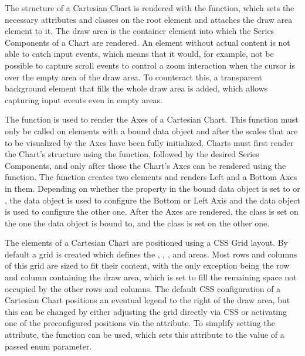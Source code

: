 The structure of a Cartesian Chart is rendered with the  function, which sets the necessary attributes and classes on the root element and attaches the draw area  element to it.
The draw area is the container element into which the Series Components of a Chart are rendered.
An  element without actual content is not able to catch input events, which means that it would, for example, not be possible to capture scroll events to control a zoom interaction when the cursor is over the empty area of the draw area.
To counteract this, a transparent  background element that fills the whole draw area is added, which allows capturing input events even in empty areas.

The  function is used to render the Axes of a Cartesian Chart.
This function must only be called on elements with a bound  data object and after the scales that are to be visualized by the Axes have been fully initialized.
Charts must first render the Chart's structure using the  function, followed by the desired Series Components, and only after those the Chart's Axes can be rendered using the  function.
The  function creates two  elements and renders Left and a Bottom Axes in them.
Depending on whether the  property in the bound data object is set to  or , the  data object is used to configure the Bottom or Left Axis and the  data object is used to configure the other one.
After the Axes are rendered, the  class is set on the one the  data object is bound to, and the  class is set on the other one.

The elements of a Cartesian Chart are positioned using a CSS Grid layout.
By default a grid is created which defines the , , , and  areas.
Most rows and columns of this grid are sized to fit their content, with the only exception being the row and column containing the draw area, which is set to fill the remaining space not occupied by the other rows and columns.
The default CSS configuration of a Cartesian Chart positions an eventual legend to the right of the draw area, but this can be changed by either adjusting the grid directly via CSS or activating one of the preconfigured positions via the  attribute.
To simplify setting the  attribute, the  function can be used, which sets this attribute to the value of a passed  enum parameter.



